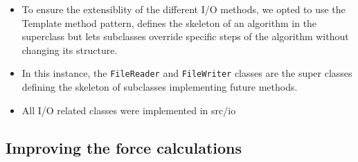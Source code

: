 \documentclass{article}
\begin{document}
\begin{itemize}
    \item To ensure the extensiblity of the different I/O methods, we opted to use the Template method pattern,  defines the skeleton of an algorithm in the superclass but lets subclasses override specific steps of the algorithm without changing its structure.
    \item In this instance, the \verb|FileReader| and \verb|FileWriter| classes are the super classes defining the skeleton of subclasses implementing future methods. 
    \item All I/O related classes were implemented in src/io

\end{itemize}

\subsection{Improving the force calculations}
\label{sec:Refactoring:forceimprovements}
\end{document}
